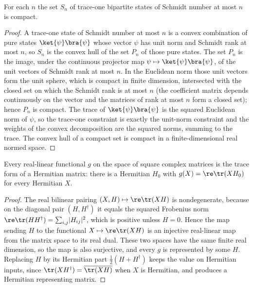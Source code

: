 \begin{theorem}
    \label{thm:compact_setOf_has_schmidt_number_le_trace_one}
    \leanok
    For each $n$ the set $S_n$ of trace-one bipartite states of Schmidt number at most
    $n$ is compact.
\end{theorem}

\begin{proof}
    \leanok
    A trace-one state of Schmidt number at most $n$ is a convex combination of pure
    states $\ket{\psi}\bra{\psi}$ whose vector $\psi$ has unit norm and Schmidt rank
    at most $n$, so $S_n$ is the convex hull of the set $P_n$ of those pure states.
    The set $P_n$ is the image, under the continuous projector map
    $\psi\mapsto\ket{\psi}\bra{\psi}$, of the unit vectors of Schmidt rank at most
    $n$. In the Euclidean norm those unit vectors form the unit sphere, which is
    compact in finite dimension, intersected with the closed set on which the Schmidt
    rank is at most $n$ (the coefficient matrix depends continuously on the vector and
    the matrices of rank at most $n$ form a closed set); hence $P_n$ is compact. The
    trace of $\ket{\psi}\bra{\psi}$ is the squared Euclidean norm of $\psi$, so the
    trace-one constraint is exactly the unit-norm constraint and the weights of the
    convex decomposition are the squared norms, summing to the trace. The convex hull
    of a compact set is compact in a finite-dimensional real normed space.
\end{proof}

\begin{theorem}
    \label{thm:exists_isHermitian_trace_form_re}
    \leanok
    Every real-linear functional $g$ on the space of square complex matrices is the
    trace form of a Hermitian matrix: there is a Hermitian $H_0$ with
    $g(X)=\re\tr(X H_0)$ for every Hermitian $X$.
\end{theorem}

\begin{proof}
    \leanok
    The real bilinear pairing $(X,H)\mapsto\re\tr(X H)$ is nondegenerate,
    because on the diagonal pair $(H,H^{\dagger})$ it equals the squared Frobenius norm
    $\re\tr(H H^{\dagger})=\sum_{i,j}\lvert H_{ij}\rvert^2$, which is positive
    unless $H=0$. Hence the map sending $H$ to the functional
    $X\mapsto\re\tr(X H)$ is an injective real-linear map from the matrix
    space to its real dual. These two spaces have the same finite real dimension, so the
    map is also surjective, and every $g$ is represented by some $H$. Replacing $H$ by
    its Hermitian part $\tfrac12(H+H^{\dagger})$ keeps the value on Hermitian inputs,
    since $\tr(X H^{\dagger})=\overline{\tr(X H)}$ when $X$ is Hermitian, and produces a
    Hermitian representing matrix.
\end{proof}

